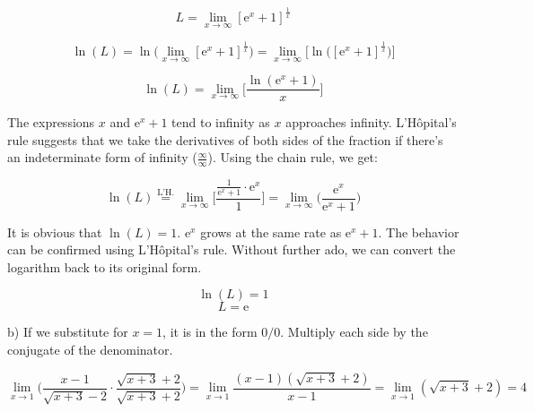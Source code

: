 \documentclass{article}
\begin{document}
\begin{equation*} L = \lim_{x \to \infty} [\mathrm{e}^x + 1]^{\frac{1}{x}} \end{equation*}

\begin{equation*}
\ln(L) = \ln\Big(\lim_{x \to \infty} [\mathrm{e}^x + 1]^{\frac{1}{x}}\Big) = \lim_{x \to \infty} \Big[ \ln\Big( [\mathrm{e}^x + 1]^{\frac{1}{x}} \Big) \Big]
\end{equation*}

\begin{equation*}
\ln(L) = \lim_{x \to \infty} \Big[ \frac{\ln(\mathrm{e}^x + 1)}{x}\Big]
\end{equation*}

\hfill

\noindent The expressions $x$ and $\mathrm{e}^x + 1$ tend to infinity as $x$ approaches infinity. L'Hôpital's rule suggests that we take the derivatives of both sides of the fraction if there's an indeterminate form of infinity ($\frac{\infty}{\infty}$). Using the chain rule, we get:

\begin{equation*}
\ln(L) \overset{\text{L'H.}}{=} \lim_{x \to \infty} \Big[ \frac{\frac{1}{\mathrm{e}^x+1} \cdot \mathrm{e}^x}{1} \Big] = \lim_{x \to \infty} \Big( \frac{\mathrm{e}^x}{\mathrm{e}^x+1} \Big)
\end{equation*}

\hfill

\noindent It is obvious that $\ln(L) = 1$. $\mathrm{e}^x$ grows at the same rate as $\mathrm{e}^x + 1$. The behavior can be confirmed using L'Hôpital's rule. Without further ado, we can convert the logarithm back to its original form.

\begin{equation*}\ln(L) = 1\end{equation*}
\begin{equation*}\boxed{L = \mathrm{e}}\end{equation*}

\hfill

\noindent b) If we substitute for $x = 1$, it is in the form $0/0$. Multiply each side by the conjugate of the denominator.

\begin{equation*}
\lim_{x \to 1}\Big( \frac{x-1}{\sqrt{x+3} - 2} \cdot \frac{\sqrt{x+3} + 2}{\sqrt{x+3} + 2} \Big) = \lim_{x \to 1} \frac{(x-1)(\sqrt{x+3} + 2)}{x-1} = \lim_{x \to 1} (\sqrt{x+3} + 2) = \boxed 4\end{equation*}
\end{document}
